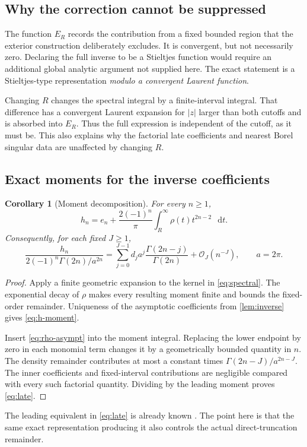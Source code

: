 \documentclass[11pt,a4paper]{article}
\newtheorem{corollary}[theorem]{Corollary}
\theoremstyle{definition}
\numberwithin{equation}{section}
\newcommand{\dd}{\mathop{}\!\mathrm{d}}
\newcommand{\Oh}{\mathcal O}
\begin{document}
\subsection{Why the correction cannot be suppressed}
The function $E_R$ records the contribution from a fixed bounded region that the exterior construction deliberately excludes. It is convergent, but not necessarily zero. Declaring the full inverse to be a Stieltjes function would require an additional global analytic argument not supplied here. The exact statement is a Stieltjes-type representation \emph{modulo a convergent Laurent function}.

Changing $R$ changes the spectral integral by a finite-interval integral. That difference has a convergent Laurent expansion for $|z|$ larger than both cutoffs and is absorbed into $E_R$. Thus the full expression is independent of the cutoff, as it must be. This also explains why the factorial late coefficients and nearest Borel singular data are unaffected by changing $R$.

\subsection{Exact moments for the inverse coefficients}
\begin{corollary}[Moment decomposition]
\label{cor:moments}
For every $n\ge1$,
\begin{equation}
 h_n=e_n+\frac{2(-1)^n}{\pi}
                 \int_R^\infty\rho(t)t^{2n-2}\,\dd t.
 \label{eq:h-moment}
\end{equation}
Consequently, for each fixed $J\ge1$,
\begin{equation}
 \frac{h_n}{2(-1)^n\Gamma(2n)/a^{2n}}
 =\sum_{j=0}^{J-1}d_ja^j\frac{\Gamma(2n-j)}{\Gamma(2n)}
       +\Oh_J(n^{-J}),\qquad a=2\pi.
 \label{eq:late}
\end{equation}
\end{corollary}
\begin{proof}
Apply a finite geometric expansion to the kernel in \eqref{eq:spectral}. The exponential decay of $\rho$ makes every resulting moment finite and bounds the fixed-order remainder. Uniqueness of the asymptotic coefficients from \cref{lem:inverse} gives \eqref{eq:h-moment}.

Insert \eqref{eq:rho-asympt} into the moment integral. Replacing the lower endpoint by zero in each monomial term changes it by a geometrically bounded quantity in $n$. The density remainder contributes at most a constant times $\Gamma(2n-J)/a^{2n-J}$. The inner coefficients and fixed-interval contributions are negligible compared with every such factorial quantity. Dividing by the leading moment proves \eqref{eq:late}.
\end{proof}
The leading equivalent in \eqref{eq:late} is already known \cite{issaka,prior}. The point here is that the same exact representation producing it also controls the actual direct-truncation remainder.
\end{document}

